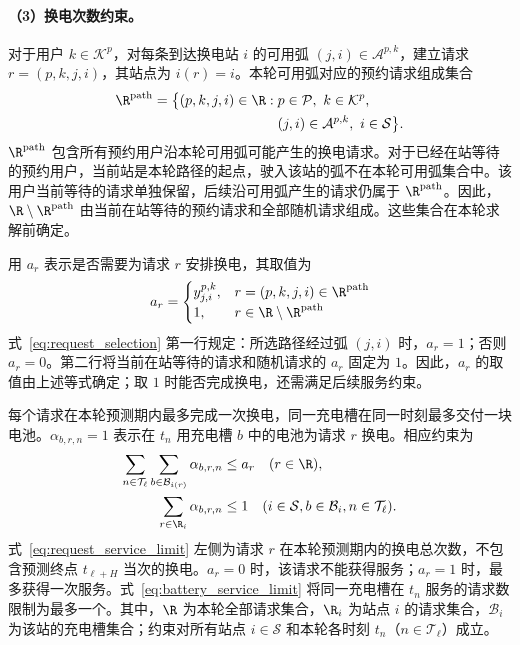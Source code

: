 \paragraph{（3）换电次数约束。}
对于用户 $k\in\mathcal K^p$，对每条到达换电站 $i$ 的可用弧 $(j,i)\in\mathcal A^{p,k}$，建立请求 $r=(p,k,j,i)$，其站点为 $i(r)=i$。本轮可用弧对应的预约请求组成集合
\[
\begin{aligned}
\R^{\mathrm{path}}=\bigl\{(p,k,j,i)\in\R:\;&
p\in\mathcal P,\ k\in\mathcal K^p,\\
&(j,i)\in\mathcal A^{p,k},\ i\in\mathcal S\bigr\}.
\end{aligned}
\]
$\R^{\mathrm{path}}$ 包含所有预约用户沿本轮可用弧可能产生的换电请求。对于已经在站等待的预约用户，当前站是本轮路径的起点，驶入该站的弧不在本轮可用弧集合中。该用户当前等待的请求单独保留，后续沿可用弧产生的请求仍属于 $\R^{\mathrm{path}}$。因此，$\R\setminus\R^{\mathrm{path}}$ 由当前在站等待的预约请求和全部随机请求组成。这些集合在本轮求解前确定。

用 $a_r$ 表示是否需要为请求 $r$ 安排换电，其取值为
\begin{equation}
a_r=\begin{cases}
y_{j,i}^{p,k},&r=(p,k,j,i)\in\R^{\mathrm{path}}\\
1,&r\in\R\setminus\R^{\mathrm{path}}
\end{cases}
\label{eq:request_selection}
\end{equation}
式~\eqref{eq:request_selection} 第一行规定：所选路径经过弧 $(j,i)$ 时，$a_r=1$；否则 $a_r=0$。第二行将当前在站等待的请求和随机请求的 $a_r$ 固定为 $1$。因此，$a_r$ 的取值由上述等式确定；取 $1$ 时能否完成换电，还需满足后续服务约束。

每个请求在本轮预测期内最多完成一次换电，同一充电槽在同一时刻最多交付一块电池。$\alpha_{b,r,n}=1$ 表示在 $t_n$ 用充电槽 $b$ 中的电池为请求 $r$ 换电。相应约束为
\begin{subequations}\label{eq:assignment_capacity}
\begin{align}
\sum_{n\in\mathcal T_\ell}
\sum_{b\in\mathcal B_{i(r)}}\alpha_{b,r,n}
&\le a_r\quad(r\in\R),\label{eq:request_service_limit}\\
\sum_{r\in\R_i}\alpha_{b,r,n}&\le1
\quad(i\in\mathcal S,b\in\mathcal B_i,n\in\mathcal T_\ell).
\label{eq:battery_service_limit}
\end{align}
\end{subequations}
式~\eqref{eq:request_service_limit} 左侧为请求 $r$ 在本轮预测期内的换电总次数，不包含预测终点 $t_{\ell+H}$ 当次的换电。$a_r=0$ 时，该请求不能获得服务；$a_r=1$ 时，最多获得一次服务。式~\eqref{eq:battery_service_limit} 将同一充电槽在 $t_n$ 服务的请求数限制为最多一个。其中，$\R$ 为本轮全部请求集合，$\R_i$ 为站点 $i$ 的请求集合，$\mathcal B_i$ 为该站的充电槽集合；约束对所有站点 $i\in\mathcal S$ 和本轮各时刻 $t_n$（$n\in\mathcal T_\ell$）成立。

